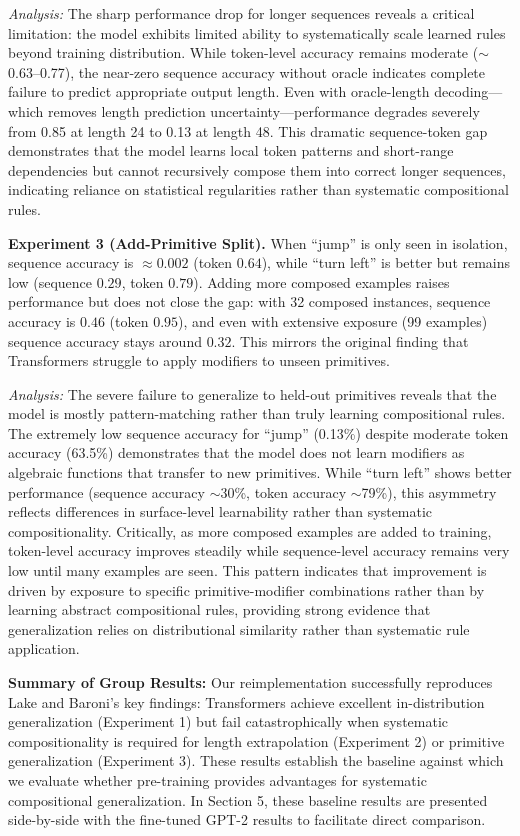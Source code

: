 \documentclass[11pt]{article}
\begin{document}
\textit{Analysis:} The sharp performance drop for longer sequences reveals a critical limitation: the model exhibits limited ability to systematically scale learned rules beyond training distribution. While token-level accuracy remains moderate ($\sim$0.63--0.77), the near-zero sequence accuracy without oracle indicates complete failure to predict appropriate output length. Even with oracle-length decoding---which removes length prediction uncertainty---performance degrades severely from 0.85 at length 24 to 0.13 at length 48. This dramatic sequence-token gap demonstrates that the model learns local token patterns and short-range dependencies but cannot recursively compose them into correct longer sequences, indicating reliance on statistical regularities rather than systematic compositional rules.

\textbf{Experiment 3 (Add-Primitive Split).} When ``jump'' is only seen in isolation, sequence accuracy is $\approx0.002$ (token $0.64$), while ``turn left'' is better but remains low (sequence $0.29$, token $0.79$). Adding more composed examples raises performance but does not close the gap: with 32 composed instances, sequence accuracy is $0.46$ (token $0.95$), and even with extensive exposure (99 examples) sequence accuracy stays around $0.32$. This mirrors the original finding that Transformers struggle to apply modifiers to unseen primitives.

\textit{Analysis:} The severe failure to generalize to held-out primitives reveals that the model is mostly pattern-matching rather than truly learning compositional rules. The extremely low sequence accuracy for ``jump'' (0.13\%) despite moderate token accuracy (63.5\%) demonstrates that the model does not learn modifiers as algebraic functions that transfer to new primitives. While ``turn left'' shows better performance (sequence accuracy $\sim$30\%, token accuracy $\sim$79\%), this asymmetry reflects differences in surface-level learnability rather than systematic compositionality. Critically, as more composed examples are added to training, token-level accuracy improves steadily while sequence-level accuracy remains very low until many examples are seen. This pattern indicates that improvement is driven by exposure to specific primitive-modifier combinations rather than by learning abstract compositional rules, providing strong evidence that generalization relies on distributional similarity rather than systematic rule application.

\textbf{Summary of Group Results:} Our reimplementation successfully reproduces Lake and Baroni's key findings: Transformers achieve excellent in-distribution generalization (Experiment 1) but fail catastrophically when systematic compositionality is required for length extrapolation (Experiment 2) or primitive generalization (Experiment 3). These results establish the baseline against which we evaluate whether pre-training provides advantages for systematic compositional generalization. In Section 5, these baseline results are presented side-by-side with the fine-tuned GPT-2 results to facilitate direct comparison.
\end{document}

